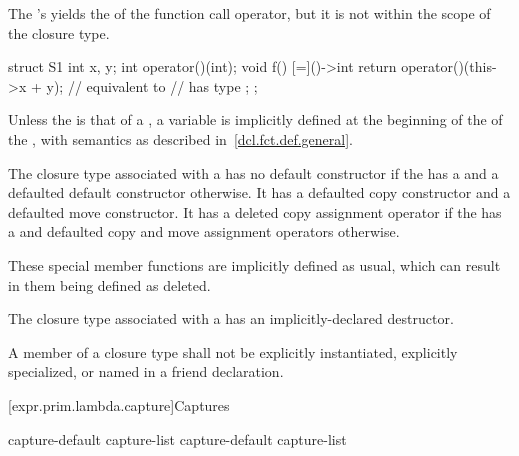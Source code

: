 \pnum
The 's  yields
the  of the function call operator,
but it is not within the scope of the closure type.
\begin{example}
\begin{codeblock}
struct S1 {
  int x, y;
  int operator()(int);
  void f() {
    [=]()->int {
      return operator()(this->x + y);   // equivalent to 
                                        //  has type 
    };
  }
};
\end{codeblock}
\end{example}
Unless the  is
that of a ,
a variable  is implicitly defined at the beginning of
the  of the ,
with semantics as described in~\ref{dcl.fct.def.general}.

\pnum
The closure type associated with a  has no
default constructor
if the  has a 
and a defaulted default constructor otherwise.
It has a defaulted copy constructor and a defaulted move constructor.
It has a deleted copy assignment operator if the 
has a  and defaulted copy and move assignment
operators otherwise.
\begin{note}
These special member functions are implicitly defined as
usual, which can result in them being defined as deleted.
\end{note}

\pnum
The closure type associated with a  has an
implicitly-declared destructor.

\pnum
A member of a closure type shall not be
explicitly instantiated,
explicitly specialized, or
named in a friend declaration.

[expr.prim.lambda.capture]{Captures}%

\begin{bnf}
\br
    capture-default\br
    capture-list\br
    capture-default \terminal{,} capture-list
\end{bnf}

\begin{bnf}
\br
    \terminal{\&}\br
    \terminal{=}
\end{bnf}

